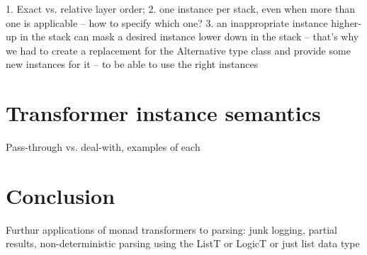 \documentclass{tmr}
\begin{document}
1. Exact vs. relative layer order; 
2. one instance per stack, even when more than one is applicable --
how to specify which one?
3. an inappropriate instance higher-up in the stack can mask a 
desired instance lower down in the stack -- that's why we had to
create a replacement for the Alternative type class and provide
some new instances for it -- to be able to use the right instances




\section{Transformer instance semantics}

Pass-through vs. deal-with, examples of each




\section{Conclusion}
Furthur applications of monad transformers to parsing:  junk logging, partial results, 
 non-deterministic parsing using the ListT or LogicT or just list data type



\end{document}
